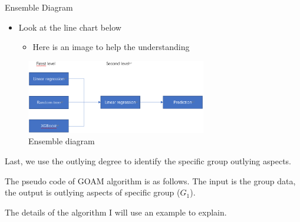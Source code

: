 \documentclass[
 size=14pt,
 paper=smartboard,  %
 mode=present, 		%
 display=slides, 	%
 style=tuliplab,  	%
 pauseslide,
 fleqn,leqno]{powerdot}
\begin{document}
\begin{slide}{Ensemble Diagram}
  \begin{itemize}
    \item
    Look at the line chart below
    \begin{itemize}
      \item
      Here is an image to help the understanding
      
      
      \end{itemize}
    \end{itemize}
    
    \begin{figure}
      \centering
      \includegraphics[width=0.7\textwidth,natwidth=919,natheight=398]{figures/ensemble.eps}
      \caption{Ensemble diagram}\label{Checking for outliers}
    \end{figure}
    
    \begin{note}
    Last,
    we use the outlying degree to identify the specific group outlying aspects.
    
    The pseudo code of GOAM algorithm is as follows.
    The input is the group data,
    the output is outlying aspects of specific group ($G_1$).
    
    The details of the algorithm I will use an example to explain.
    \end{note}

\end{slide}
\end{document}
